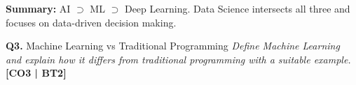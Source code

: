 \documentclass[12pt,a4paper]{article}
\newcommand{\Qno}[1]{\textbf{\color{darkred}Q#1.}}
\begin{document}
\begin{answerenv}
\begin{keypoint}
\textbf{Summary:} AI $\supset$ ML $\supset$ Deep Learning. Data Science intersects all three and focuses on data-driven decision making.
\end{keypoint}

\end{answerenv}

\vspace{8pt}

\begin{questionbox}{\Qno{3} Machine Learning vs Traditional Programming}
\textit{Define Machine Learning and explain how it differs from traditional programming with a suitable example.} \hfill \textbf{[CO3 | BT2]}
\end{questionbox}
\end{document}

